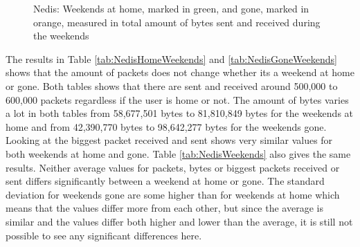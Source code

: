 \begin{figure}[H]
    \begin{subfigure}[b]{0.47\textwidth}
    \end{subfigure}
    \begin{subfigure}[b]{0.47\textwidth}
    \end{subfigure}
   \begin{subfigure}[b]{0.47\textwidth}
    \end{subfigure}
    \hspace{0.6cm}
    \begin{subfigure}[b]{0.47\textwidth}
    \end{subfigure}
  \caption{Nedis: Weekends at home, marked in green, and gone, marked in orange, measured in total amount of bytes sent and received during the weekends}    \label{fig:NedisWeekendBytes}
\end{figure}

The results in Table \ref{tab:NedisHomeWeekends} and \ref{tab:NedisGoneWeekends} shows that the amount of packets does not change whether its a weekend at home or gone. Both tables shows that there are sent and received around 500,000 to 600,000 packets regardless if the user is home or not. The amount of bytes varies a lot in both tables from 58,677,501 bytes to 81,810,849 bytes for the weekends at home and from 42,390,770 bytes to 98,642,277 bytes for the weekends gone. Looking at the biggest packet received and sent shows very similar values for both weekends at home and gone. Table \ref{tab:NedisWeekends} also gives the same results. Neither average values for packets, bytes or biggest packets received or sent differs significantly between a weekend at home or gone. The standard deviation for weekends gone are some higher than for weekends at home which means that the values differ more from each other, but since the average is similar and the values differ both higher and lower than the average, it is still not possible to see any significant differences here.  